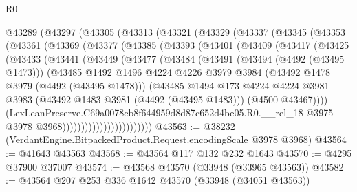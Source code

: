 \begin{lexlean}{R0}
\begin{coremodule}
    @43289
      (@43297
        (@43305
          (@43313
            (@43321
              (@43329
                (@43337
                  (@43345
                    (@43353
                      (@43361
                        (@43369
                          (@43377
                            (@43385
                              (@43393
                                (@43401
                                  (@43409
                                    (@43417
                                      (@43425
                                        (@43433
                                          (@43441
                                            (@43449
                                              (@43477
                                                (@43484
                                                  (@43491
                                                    (@43494 (@4492 (@43495 @1473)))
                                                    (@43485
                                                      @1492
                                                      @1496
                                                      @4224
                                                      @4226
                                                      @3979
                                                      @3984
                                                      (@43492 @1478 @3979 (@4492 (@43495 @1478)))
                                                      (@43485
                                                        @1494
                                                        @173
                                                        @4224
                                                        @4224
                                                        @3981
                                                        @3983
                                                        (@43492 @1483 @3981 (@4492 (@43495 @1483)))
                                                        (@4500 @43467))))
                                                  (LexLeanPreserve.C69a0078cb8f644959d8d87c652d4be05.R0.__rel_18
                                                    @3975
                                                    @3978
                                                    @3968))))))))))))))))))))))))
@43563 := @38232 (VerdantEngine.BitpackedProduct.Request.encodingScale @3978 @3968)
@43564 := @41643 @43563
@43568 := @43564 @117 @132 @232 @1643
@43570 := @4295 @37900 @37007
@43574 := @43568 @43570 (@33948 (@33965 @43563))
@43582 := @43564 @207 @253 @336 @1642 @43570 (@33948 (@34051 @43563))

\end{coremodule}
\end{lexlean}
